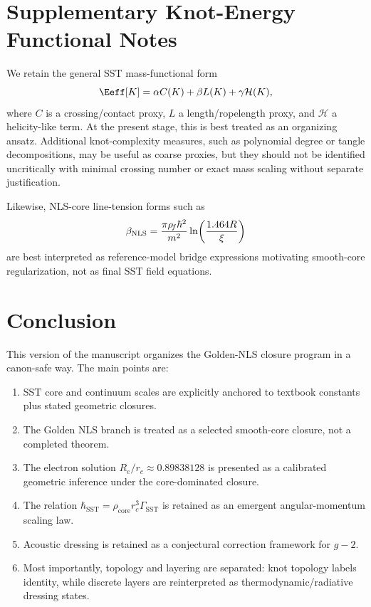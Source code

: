 \documentclass[11pt]{article}
\newcommand{\rc}{r_c}                                    %
\begin{document}
    \section{Supplementary Knot-Energy Functional Notes}
    \label{sec:knot_functional_notes}
    
    We retain the general SST mass-functional form
    \begin{equation}
        \Eeff[K]=\alpha C(K)+\beta L(K)+\gamma \mathcal{H}(K),
    \end{equation}
    where \(C\) is a crossing/contact proxy, \(L\) a length/ropelength proxy, and \(\mathcal{H}\) a helicity-like term. At the present stage, this is best treated as an organizing ansatz. Additional knot-complexity measures, such as polynomial degree or tangle decompositions, may be useful as coarse proxies, but they should not be identified uncritically with minimal crossing number or exact mass scaling without separate justification.
    
    Likewise, NLS-core line-tension forms such as
    \begin{equation}
        \beta_{\rm NLS}
        =
        \frac{\pi \rho_{\!f}\hbar^2}{m^2}
        \ln\!\left(\frac{1.464 R}{\xi}\right)
    \end{equation}
    are best interpreted as reference-model bridge expressions motivating smooth-core regularization, not as final SST field equations.

    \section{Conclusion}
    
    This version of the manuscript organizes the Golden-NLS closure program in a canon-safe way. The main points are:
    
    \begin{enumerate}
        \item SST core and continuum scales are explicitly anchored to textbook constants plus stated geometric closures.
        \item The Golden NLS branch is treated as a selected smooth-core closure, not a completed theorem.
        \item The electron solution \(R_e/\rc \approx 0.89838128\) is presented as a calibrated geometric inference under the core-dominated closure.
        \item The relation \(\hbar_{\text{SST}}=\rho_{\text{core}}\rc^3\Gamma_{\text{SST}}\) is retained as an emergent angular-momentum scaling law.
        \item Acoustic dressing is retained as a conjectural correction framework for \(g-2\).
        \item Most importantly, topology and layering are separated: knot topology labels identity, while discrete layers are reinterpreted as thermodynamic/radiative dressing states.
    \end{enumerate}
    
\end{document}
